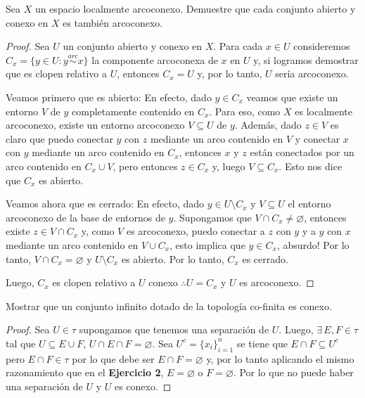 \documentclass{article}
\theoremstyle{definition}
\newenvironment{ejercicio}[1]{\begin{trivlist}
\item[\hskip \labelsep {\bfseries Ejercicio}\hskip \labelsep {\bfseries #1.}]}{\end{trivlist}}
\begin{document}
\begin{ejercicio}{10}
    Sea \(X\) un espacio localmente arcoconexo. Demuestre que cada conjunto abierto y conexo en \(X\) es también arcoconexo.
\end{ejercicio}
\begin{proof}
    Sea \( U \) un conjunto abierto y conexo en \( X \). Para cada \( x \in U \) consideremos \( C_x = \{ y \in U : y \overset{arc}{\sim} x \} \) la componente arcoconexa de \( x \) en \( U \) y, si logramos demostrar que es clopen relativo a \( U \), entonces \( C_x = U \) y, por lo tanto, \( U \) sería arcoconexo.

    Veamos primero que es abierto: En efecto, dado \( y \in C_x \) veamos que existe un entorno \( V \) de \( y \)
    completamente contenido en \( C_x \). Para eso, como \( X \) es localmente arcoconexo, existe un entorno arcoconexo \( V \subseteq U \) de \( y \).
    Además, dado \( z \in V \) es claro que puedo conectar \( y \) con \( z \) mediante un arco contenido en \( V \) y conectar
    \( x \) con \( y \) mediante un arco contenido en \( C_x \), entonces \( x \) y \( z \) están conectados por un arco contenido en \( C_x \cup V \), pero entonces \( z \in C_x \) y, luego \( V \subseteq C_x \).
    Esto nos dice que \( C_x \) es abierto.

    Veamos ahora que es cerrado: En efecto, dado \( y \in U \setminus C_x \) y \( V \subseteq U \) el entorno arcoconexo de la base de entornos de \( y \).
    Supongamos que \( V \cap C_x \neq \varnothing \), entonces existe \( z \in V \cap C_x \) y, como \( V \) es arcoconexo,
    puedo conectar a \( z \) con \( y \) y a \( y \) con \( x \) mediante un arco contenido en \( V \cup C_x \), esto implica que \( y \in C_x \), absurdo! Por lo tanto,
    \( V \cap C_x = \varnothing \) y \( U \setminus C_x \) es abierto. Por lo tanto, \( C_x \) es cerrado.

    Luego, \( C_x \) es clopen relativo a \( U \) conexo \( \therefore U = C_x \) y \( U \) es arcoconexo.
\end{proof}

\begin{ejercicio}{11}
    Mostrar que un conjunto infinito dotado de la topología co-finita es conexo.
\end{ejercicio}
\begin{proof}
    Sea \( U \in \tau \) supongamos que tenemos una separación de \( U \). Luego, \( \exists \, E, F \in \tau \) tal que
    \( U \subseteq E \cup F \), \( U \cap E \cap F = \varnothing \). Sea \( U^c = {\{ x_i \}}_{i=1}^n \) se tiene que \( E \cap F \subseteq U^c \) pero \( E \cap F \in \tau \) por lo que
    debe ser \( E \cap F = \varnothing \) y, por lo tanto aplicando el mismo razonamiento que en el \textbf{Ejercicio 2}, \( E = \varnothing \) o \( F = \varnothing \). Por lo que no
    puede haber una separación de \( U \) y \( U \) es conexo.
\end{proof}
\end{document}
